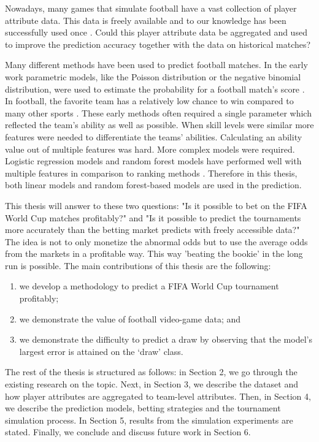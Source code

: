 Nowadays,  many games that simulate football have a vast collection of player attribute data. This data is freely available and to our knowledge has been successfully used once \cite{shin2014novel}. Could this player attribute data be aggregated and used to improve the prediction accuracy together with the data on historical matches?

Many different methods have been used to predict football matches. In the early work parametric models, like the Poisson distribution or the negative binomial distribution, were used to estimate the probability for a football match's score \cite{moroney1962facts, dixon1997}. In football, the favorite team has a relatively low chance to win compared to many other sports \cite{anderson2013numbers}. These early methods often required a single parameter which reflected the team's ability as well as possible. When skill levels were similar more features were needed to differentiate the teams' abilities. Calculating an ability value out of multiple features was hard. More complex models were required. Logistic regression models and random forest models have performed well with multiple features in comparison to ranking methods \cite{groll2018prediction, 10.1007/978-3-319-29504-6_48}. Therefore in this thesis, both linear models and random forest-based models are used in the prediction.

This thesis will answer to these two questions: "Is it possible to bet on the FIFA World Cup matches profitably?" and "Is it possible to predict the tournaments more accurately than the betting market predicts with freely accessible data?" The idea is not to only monetize the abnormal odds but to use the average odds from the markets in a profitable way. This way 'beating the bookie' in the long run is possible. The main contributions of this thesis are the following:
\begin{enumerate}
  \item we develop a methodology to predict a FIFA World Cup tournament profitably;
  \item we demonstrate the value of football video-game data; and
  \item we demonstrate the difficulty to predict a draw by observing that the model’s largest error is attained on the `draw’ class.
\end{enumerate}

The rest of the thesis is structured as follows: in Section 2, we go through the existing research on the topic. Next, in Section 3, we describe the dataset and how player attributes are aggregated to team-level attributes. Then, in Section 4, we describe the prediction models, betting strategies and the tournament simulation process. In Section 5, results from the simulation experiments are stated. Finally, we conclude and discuss future work in Section 6.
